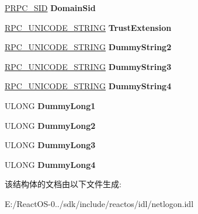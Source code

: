 \begin{DoxyCompactItemize}
\hyperlink{struct___r_p_c___s_i_d}{P\+R\+P\+C\+\_\+\+S\+ID} {\bfseries Domain\+Sid}
\item 
\mbox{\label{struct___n_e_t_l_o_g_o_n___o_n_e___d_o_m_a_i_n___i_n_f_o_ad4955b6d98e0db72753fe01fe3d5f9ab}} 
\hyperlink{struct___r_p_c___u_n_i_c_o_d_e___s_t_r_i_n_g}{R\+P\+C\+\_\+\+U\+N\+I\+C\+O\+D\+E\+\_\+\+S\+T\+R\+I\+NG} {\bfseries Trust\+Extension}
\item 
\mbox{\label{struct___n_e_t_l_o_g_o_n___o_n_e___d_o_m_a_i_n___i_n_f_o_a865c0f63df19690c527534d46038c494}} 
\hyperlink{struct___r_p_c___u_n_i_c_o_d_e___s_t_r_i_n_g}{R\+P\+C\+\_\+\+U\+N\+I\+C\+O\+D\+E\+\_\+\+S\+T\+R\+I\+NG} {\bfseries Dummy\+String2}
\item 
\mbox{\label{struct___n_e_t_l_o_g_o_n___o_n_e___d_o_m_a_i_n___i_n_f_o_a1a108c65c56e2e63eb81ccf224382681}} 
\hyperlink{struct___r_p_c___u_n_i_c_o_d_e___s_t_r_i_n_g}{R\+P\+C\+\_\+\+U\+N\+I\+C\+O\+D\+E\+\_\+\+S\+T\+R\+I\+NG} {\bfseries Dummy\+String3}
\item 
\mbox{\label{struct___n_e_t_l_o_g_o_n___o_n_e___d_o_m_a_i_n___i_n_f_o_a6c1bab83a48e5c18a4f629fb96037ee7}} 
\hyperlink{struct___r_p_c___u_n_i_c_o_d_e___s_t_r_i_n_g}{R\+P\+C\+\_\+\+U\+N\+I\+C\+O\+D\+E\+\_\+\+S\+T\+R\+I\+NG} {\bfseries Dummy\+String4}
\item 
\mbox{\label{struct___n_e_t_l_o_g_o_n___o_n_e___d_o_m_a_i_n___i_n_f_o_a3782d92a920df9c61496a7aa6e3c948e}} 
U\+L\+O\+NG {\bfseries Dummy\+Long1}
\item 
\mbox{\label{struct___n_e_t_l_o_g_o_n___o_n_e___d_o_m_a_i_n___i_n_f_o_a2834dce4fca3b5cb847e582335d3e72d}} 
U\+L\+O\+NG {\bfseries Dummy\+Long2}
\item 
\mbox{\label{struct___n_e_t_l_o_g_o_n___o_n_e___d_o_m_a_i_n___i_n_f_o_af771e59586187697d8fad48b43a96c54}} 
U\+L\+O\+NG {\bfseries Dummy\+Long3}
\item 
\mbox{\label{struct___n_e_t_l_o_g_o_n___o_n_e___d_o_m_a_i_n___i_n_f_o_a3f51ce04c69ff8717ea7dfaccd6c2618}} 
U\+L\+O\+NG {\bfseries Dummy\+Long4}
\end{DoxyCompactItemize}


该结构体的文档由以下文件生成\+:\begin{DoxyCompactItemize}
\item 
E\+:/\+React\+O\+S-\/0../sdk/include/reactos/idl/netlogon.\+idl\end{DoxyCompactItemize}
